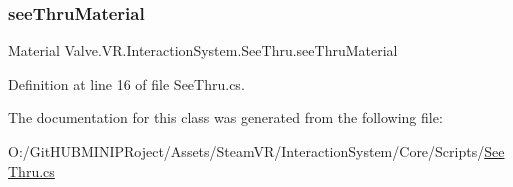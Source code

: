 \subsubsection{\texorpdfstring{seeThruMaterial}{seeThruMaterial}}
{\footnotesize\ttfamily Material Valve.\+V\+R.\+Interaction\+System.\+See\+Thru.\+see\+Thru\+Material}



Definition at line 16 of file See\+Thru.\+cs.



The documentation for this class was generated from the following file\+:\begin{DoxyCompactItemize}
\item 
O\+:/\+Git\+H\+U\+B\+M\+I\+N\+I\+P\+Roject/\+Assets/\+Steam\+V\+R/\+Interaction\+System/\+Core/\+Scripts/\mbox{\hyperlink{_see_thru_8cs}{See\+Thru.\+cs}}\end{DoxyCompactItemize}
